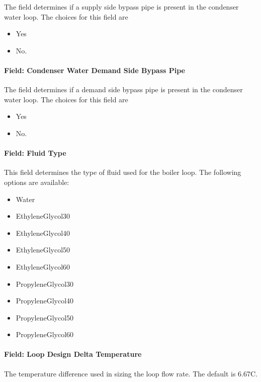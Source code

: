 The field determines if a supply side bypass pipe is present in the condenser water loop. The choices for this field are

\begin{itemize}
\item
  Yes
\item
  No.
\end{itemize}

\paragraph{Field: Condenser Water Demand Side Bypass Pipe}\label{field-condenser-water-demand-side-bypass-pipe}

The field determines if a demand side bypass pipe is present in the condenser water loop. The choices for this field are

\begin{itemize}
\item
  Yes
\item
  No.
\end{itemize}

\paragraph{Field: Fluid Type}\label{field-fluid-type-000}

This field determines the type of fluid used for the boiler loop. The following options are available:

\begin{itemize}
\item
  Water
\item
  EthyleneGlycol30
\item
  EthyleneGlycol40
\item
  EthyleneGlycol50
\item
  EthyleneGlycol60
\item
  PropyleneGlycol30
\item
  PropyleneGlycol40
\item
  PropyleneGlycol50
\item
  PropyleneGlycol60
\end{itemize}

\paragraph{Field: Loop Design Delta Temperature}\label{field-loop-design-delta-temperature}

The temperature difference used in sizing the loop flow rate. The default is 6.67C.

